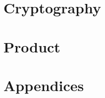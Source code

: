 \documentclass[11pt,twoside,openright]{book}
\begin{document}
\part{Cryptography}





\part{Product}




\appendix
\part{Appendices}




\backmatter
\cleardoublepage
{}
{}
\printindex
\end{document}
